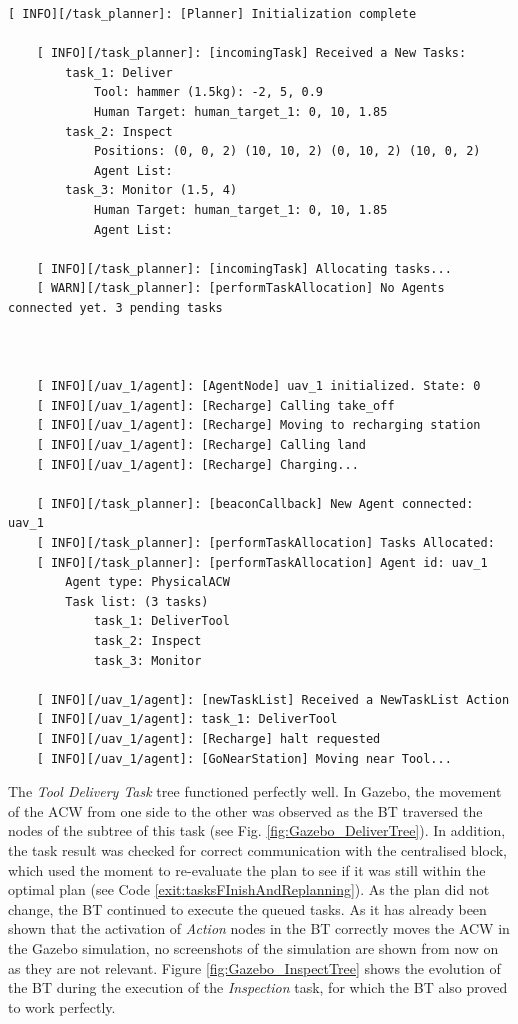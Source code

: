 \begin{lstlisting}[caption={Feedback of the task planning process and communications between \emph{High-Level Planner} and \emph{Agent Behaviour Manager} at the beginning of the simulation}, breaklines=true, label=exit:newtaskqueue]
    [ INFO][/task_planner]: [Planner] Initialization complete

    [ INFO][/task_planner]: [incomingTask] Received a New Tasks:
        task_1: Deliver
            Tool: hammer (1.5kg): -2, 5, 0.9
            Human Target: human_target_1: 0, 10, 1.85
        task_2: Inspect
            Positions: (0, 0, 2) (10, 10, 2) (0, 10, 2) (10, 0, 2)
            Agent List:
        task_3: Monitor (1.5, 4)
            Human Target: human_target_1: 0, 10, 1.85
            Agent List:
    
    [ INFO][/task_planner]: [incomingTask] Allocating tasks...
    [ WARN][/task_planner]: [performTaskAllocation] No Agents connected yet. 3 pending tasks
    
    
    
    [ INFO][/uav_1/agent]: [AgentNode] uav_1 initialized. State: 0
    [ INFO][/uav_1/agent]: [Recharge] Calling take_off
    [ INFO][/uav_1/agent]: [Recharge] Moving to recharging station
    [ INFO][/uav_1/agent]: [Recharge] Calling land
    [ INFO][/uav_1/agent]: [Recharge] Charging...
    
    [ INFO][/task_planner]: [beaconCallback] New Agent connected: uav_1
    [ INFO][/task_planner]: [performTaskAllocation] Tasks Allocated:
    [ INFO][/task_planner]: [performTaskAllocation] Agent id: uav_1
        Agent type: PhysicalACW
        Task list: (3 tasks)
            task_1: DeliverTool
            task_2: Inspect
            task_3: Monitor
    
    [ INFO][/uav_1/agent]: [newTaskList] Received a NewTaskList Action
    [ INFO][/uav_1/agent]: task_1: DeliverTool
    [ INFO][/uav_1/agent]: [Recharge] halt requested
    [ INFO][/uav_1/agent]: [GoNearStation] Moving near Tool...
\end{lstlisting}

The \emph{Tool Delivery Task} tree functioned perfectly well. In Gazebo, the movement of the \gls{ACW} from one side to the other was observed as the \gls{BT} traversed the nodes of the subtree of this task (see Fig. \ref{fig:Gazebo_DeliverTree}). In addition, the task result was checked for correct communication with the centralised block, which used the moment to re-evaluate the plan to see if it was still within the optimal plan (see Code \ref{exit:tasksFInishAndReplanning}). As the plan did not change, the \gls{BT} continued to execute the queued tasks. As it has already been shown that the activation of \emph{Action} nodes in the \gls{BT} correctly moves the \gls{ACW} in the Gazebo simulation, no screenshots of the simulation are shown from now on as they are not relevant. Figure \ref{fig:Gazebo_InspectTree} shows the evolution of the \gls{BT} during the execution of the \emph{Inspection} task, for which the \gls{BT} also proved to work perfectly. 


